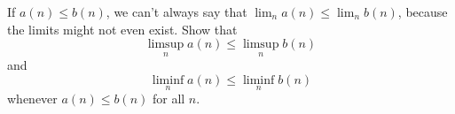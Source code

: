 \documentclass[12pt]{article}
\theoremstyle{definition}
\begin{document}
\begin{Exercise}
    If $a(n) \leq b(n)$, we can't always say that $\lim_n a(n) \leq \lim_n
    b(n)$, because the limits might not even exist. Show that
    \begin{equation*}
        \limsup_n a(n) \leq \limsup_n b(n)
    \end{equation*}
    and
    \begin{equation*}
        \liminf_n a(n) \leq \liminf_n b(n)
    \end{equation*}
    whenever $a(n) \leq b(n)$ for all $n$.
\end{Exercise}
\end{document}
